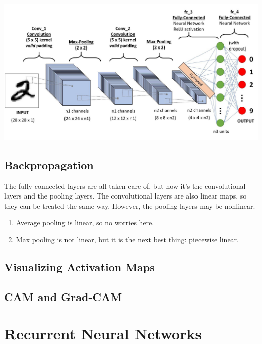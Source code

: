 \documentclass{article}
\begin{document}
    \begin{center}
        \includegraphics[scale=0.25]{img/03_CNN/CNN_architecture.jpeg}
    \end{center}

    \subsection{Backpropagation}

    The fully connected layers are all taken care of, but now it's the convolutional layers and the pooling layers. The convolutional layers are also linear maps, so they can be treated the same way. However, the pooling layers may be nonlinear. 
    \begin{enumerate}
      \item Average pooling is linear, so no worries here. 
      \item Max pooling is not linear, but it is the next best thing: piecewise linear. 
    \end{enumerate}

  \subsection{Visualizing Activation Maps}

    \subsection{CAM and Grad-CAM}


\section{Recurrent Neural Networks}
\end{document}
